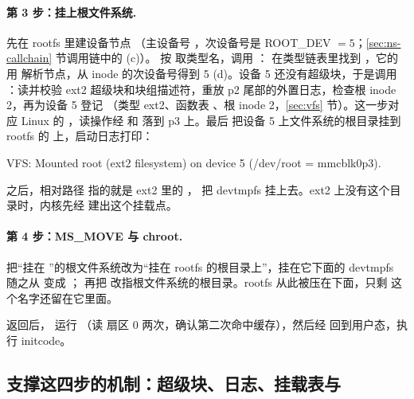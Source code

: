 \paragraph{第 3 步：挂上根文件系统.} 先在 rootfs 里建设备节点 （主设备号 ，次设备号是 ROOT\_DEV $=5$；\ref{sec:ns-callchain} 节调用链中的 (c)）。 按  取类型名，调用 ： 在类型链表里找到 ，它的  用  解析节点，从 inode 的次设备号得到 5 (d)。设备 5 还没有超级块，于是调用 ：读并校验 ext2 超级块和块组描述符，重放 p2 尾部的外置日志，检查根 inode 2，再为设备 5 登记 （类型 ext2、函数表 、根 inode 2，\ref{sec:vfs} 节）。这一步对应 Linux 的 ，读操作经  和  落到 p3 上。最后  把设备 5 上文件系统的根目录挂到 rootfs 的  上，启动日志打印：

\begin{txtcode}
VFS: Mounted root (ext2 filesystem) on device 5 (/dev/root = mmcblk0p3).
\end{txtcode}

 之后，相对路径  指的就是 ext2 里的 ， 把 devtmpfs 挂上去。ext2 上没有这个目录时，内核先经  建出这个挂载点。

\paragraph{第 4 步：MS\_MOVE 与 chroot.}  把“挂在 ”的根文件系统改为“挂在 rootfs 的根目录上”，挂在它下面的 devtmpfs 随之从  变成 ； 再把 \code{/} 改指根文件系统的根目录。rootfs 从此被压在下面，只剩  这个名字还留在它里面。

 返回后， 运行 （读  扇区 0 两次，确认第二次命中缓存），然后经  回到用户态，执行 initcode。

\subsection{支撑这四步的机制：超级块、日志、挂载表与 }
\label{sec:ns-mech}

